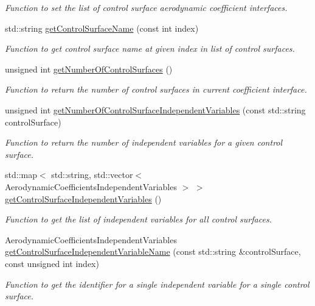 \begin{DoxyCompactItemize}
\begin{DoxyCompactList}\small\item\em Function to set the list of control surface aerodynamic coefficient interfaces. \end{DoxyCompactList}\item 
std\+::string \hyperlink{classtudat_1_1aerodynamics_1_1AerodynamicCoefficientInterface_a69a2aa883a2fba8bc918dcd60a654eb9}{get\+Control\+Surface\+Name} (const int index)
\begin{DoxyCompactList}\small\item\em Function to get control surface name at given index in list of control surfaces. \end{DoxyCompactList}\item 
unsigned int \hyperlink{classtudat_1_1aerodynamics_1_1AerodynamicCoefficientInterface_aeec44dc3a056968cb685dd3f0642bf5d}{get\+Number\+Of\+Control\+Surfaces} ()
\begin{DoxyCompactList}\small\item\em Function to return the number of control surfaces in current coefficient interface. \end{DoxyCompactList}\item 
unsigned int \hyperlink{classtudat_1_1aerodynamics_1_1AerodynamicCoefficientInterface_a1ca99957277b60ca79aaf4eb48e3f003}{get\+Number\+Of\+Control\+Surface\+Independent\+Variables} (const std\+::string control\+Surface)
\begin{DoxyCompactList}\small\item\em Function to return the number of independent variables for a given control surface. \end{DoxyCompactList}\item 
std\+::map$<$ std\+::string, std\+::vector$<$ Aerodynamic\+Coefficients\+Independent\+Variables $>$ $>$ \hyperlink{classtudat_1_1aerodynamics_1_1AerodynamicCoefficientInterface_a63f2ffc4d03a6902e0760f93b1931b5a}{get\+Control\+Surface\+Independent\+Variables} ()
\begin{DoxyCompactList}\small\item\em Function to get the list of independent variables for all control surfaces. \end{DoxyCompactList}\item 
Aerodynamic\+Coefficients\+Independent\+Variables \hyperlink{classtudat_1_1aerodynamics_1_1AerodynamicCoefficientInterface_ad5c005acfa80f3761f20850a855d1644}{get\+Control\+Surface\+Independent\+Variable\+Name} (const std\+::string \&control\+Surface, const unsigned int index)
\begin{DoxyCompactList}\small\item\em Function to get the identifier for a single independent variable for a single control surface. \end{DoxyCompactList}\end{DoxyCompactItemize}
